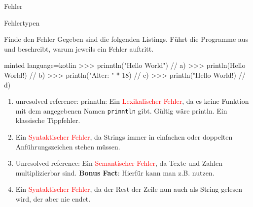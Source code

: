\begin{task}[points=auto]{Fehler}
\begin{subtask*}[points=0]{Fehlertypen }
\begin{solution}
        \end{solution}
    \end{subtask*}
    \begin{subtask*}[points=0]{Finde den Fehler }
        Gegeben sind die folgenden Listings. Führt die Programme aus und beschreibt, warum jeweils ein Fehler auftritt.
        \begin{codeBlock}[]{minted language=kotlin}
            >>> prinntln("Hello World") // a)
            >>> println(Hello World!)    // b)
            >>> println("Alter: " * 18)  // c)
            >>> println("Hello World!)   // d)
        \end{codeBlock}
        \begin{solution}
            \begin{enumerate}
                \item {\ttfamily unresolved reference: prinntln}: Ein \textcolor{red}{Lexikalischer Fehler}, da es keine Funktion mit dem angegebenen Namen
                    \texttt	{prinntln} gibt. Gültig wäre {\ttfamily println}. Ein klassische Tippfehler.
                \item Ein \textcolor{red}{Syntaktischer Fehler}, da Strings immer in einfachen oder doppelten Anführungszeichen
                    stehen müssen.
                \item {\ttfamily Unresolved reference}: Ein \textcolor{red}{Semantischer Fehler}, da Texte und Zahlen multiplizierbar sind.
                    \textbf{Bonus Fact}: Hierfür kann man z.B.  nutzen.
                \item Ein \textcolor{red}{Syntaktischer Fehler}, da der Rest der Zeile nun auch als String gelesen wird, der aber nie endet.
            \end{enumerate}

        \end{solution}
    \end{subtask*}
\end{task}
